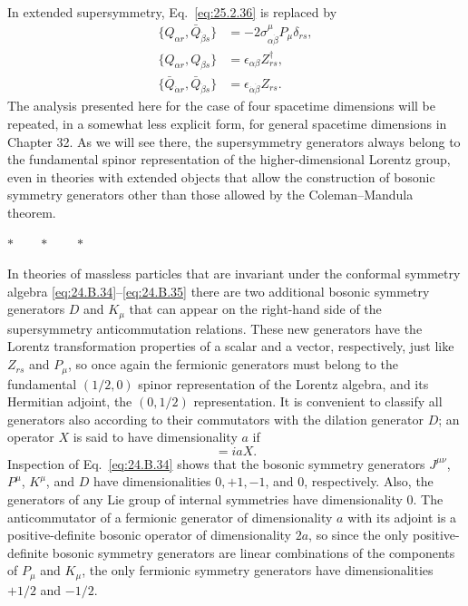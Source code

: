 In extended supersymmetry, Eq.~\eqref{eq:25.2.36} is replaced by
\begin{equation}
\begin{aligned}
\{Q_{\alpha r},\bar Q_{\dot\beta s}\}
  &=-2\sigma^\mu_{\alpha\dot\beta}P_\mu\delta_{rs},\\
\{Q_{\alpha r},Q_{\beta s}\}
  &=\epsilon_{\alpha\beta}Z_{rs}^\dagger,\\
\{\bar Q_{\dot\alpha r},\bar Q_{\dot\beta s}\}
  &=\epsilon_{\dot\alpha\dot\beta}Z_{rs}.
\end{aligned}
\tag{25.2.38}\label{eq:25.2.38}
\end{equation}
The analysis presented here for the case of four spacetime dimensions will
be repeated, in a somewhat less explicit form, for general spacetime
dimensions in Chapter 32. As we will see there, the supersymmetry generators
always belong to the fundamental spinor representation of the
higher-dimensional Lorentz group, even in theories with extended objects
that allow the construction of bosonic symmetry generators other than those
allowed by the Coleman--Mandula theorem.

\begin{center}
\(\ast\qquad\ast\qquad\ast\)
\end{center}

In theories of massless particles that are invariant under the conformal
symmetry algebra \eqref{eq:24.B.34}--\eqref{eq:24.B.35} there are two
additional bosonic symmetry generators \(D\) and \(K_\mu\) that can appear
on the right-hand side of the supersymmetry anticommutation relations.
These new generators have the Lorentz transformation properties of a scalar
and a vector, respectively, just like \(Z_{rs}\) and \(P_\mu\), so once
again the fermionic generators must belong to the fundamental \((1/2,0)\)
spinor representation of the Lorentz algebra, and its Hermitian adjoint,
the \((0,1/2)\) representation. It is convenient to classify all generators
also according to their commutators with the dilation generator \(D\); an
operator \(X\) is said to have dimensionality \(a\) if
\begin{equation}
[X,D]=iaX.
\tag{25.2.39}\label{eq:25.2.39}
\end{equation}
Inspection of Eq.~\eqref{eq:24.B.34} shows that the bosonic symmetry
generators \(J^{\mu\nu}\), \(P^\mu\), \(K^\mu\), and \(D\) have
dimensionalities \(0,+1,-1\), and \(0\), respectively. Also, the
generators of any Lie group of internal symmetries have dimensionality
0. The anticommutator of a fermionic generator of dimensionality \(a\)
with its adjoint is a positive-definite bosonic operator of dimensionality
\(2a\), so since the only positive-definite bosonic symmetry generators
are linear combinations of the components of \(P_\mu\) and \(K_\mu\), the
only fermionic symmetry generators have dimensionalities \(+1/2\) and
\(-1/2\).

